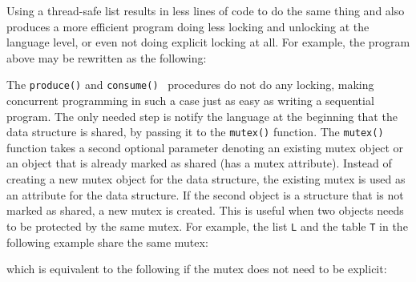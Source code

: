 Using a thread-safe list results in less lines of code to do the same
thing and also produces a more efficient program doing less locking and
unlocking at the language level, or even not doing explicit locking at
all. For example, the program above may be rewritten as the following: 


The \texttt{produce()} and \texttt{consume()}
\ procedures do not do any locking, making concurrent programming in
such a case just as easy as writing a sequential program. The only
needed step is notify the language at the beginning that the data
structure is shared, by passing it to the \texttt{mutex()}
function. The \texttt{mutex()} function takes a second
optional parameter denoting an existing mutex object or an object that
is already marked as shared (has a mutex attribute). Instead of
creating a new mutex object for the data structure, the existing mutex
is used as an attribute for the data structure. If the second object is
a structure that is not marked as shared, a new mutex is created. This
is useful when two objects needs to be protected by the same mutex. For
example, the list \texttt{L} and the table
\texttt{T} in the following example share the same mutex:


which is equivalent to the following if the mutex does not need to be
explicit:


